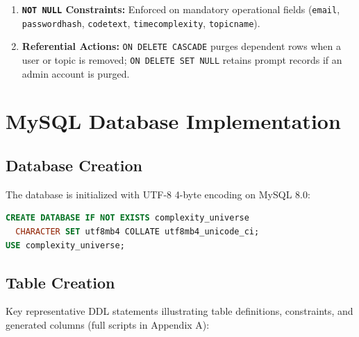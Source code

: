 \documentclass[12pt,a4paper]{report}
\DeclareRobustCommand{\_}{\textunderscore\allowbreak}
\begin{document}
\begin{enumerate}
\begin{itemize}
        \item \texttt{uq\_topics\_slug}: Guarantees unique URL paths for curriculum topics.
        \item \texttt{uq\_saved\_user\_topic}: Composite uniqueness on (\texttt{user\_id}, \texttt{topic\_id}).
    \end{itemize}
    \item \textbf{\texttt{NOT NULL} Constraints:} Enforced on mandatory operational fields (\texttt{email}, \texttt{password\_hash}, \texttt{code\_text}, \texttt{time\_complexity}, \texttt{topic\_name}).
    \item \textbf{Referential Actions:} \texttt{ON DELETE CASCADE} purges dependent rows when a user or topic is removed; \texttt{ON DELETE SET NULL} retains prompt records if an admin account is purged.
\end{enumerate}

\chapter{MySQL Database Implementation}

\section{Database Creation}
The database is initialized with UTF-8 4-byte encoding on MySQL 8.0:
\begin{lstlisting}[language=SQL]
CREATE DATABASE IF NOT EXISTS complexity_universe
  CHARACTER SET utf8mb4 COLLATE utf8mb4_unicode_ci;
USE complexity_universe;
\end{lstlisting}

\section{Table Creation}
Key representative DDL statements illustrating table definitions, constraints, and generated columns (full scripts in Appendix A):
\end{document}
